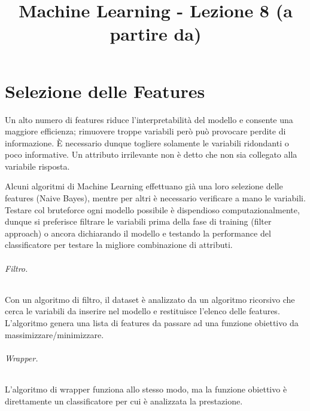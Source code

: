 \documentclass[11pt, a4page, twocolumn]{article}
\title{Machine Learning - Lezione 8 (a partire da)}
\date{}
\begin{document}
\maketitle


\part{Selezione delle Features}
Un alto numero di features riduce l'interpretabilità del modello e consente una maggiore efficienza; rimuovere troppe variabili però può provocare perdite di informazione.
È necessario dunque togliere solamente le variabili ridondanti o poco informative.
Un attributo irrilevante non è detto che non sia collegato alla variabile risposta. \newline

Alcuni algoritmi di Machine Learning effettuano già una loro selezione delle features (Naive Bayes), mentre per altri è necessario verificare a mano le variabili.
Testare col bruteforce ogni modello possibile è dispendioso computazionalmente, dunque si preferisce filtrare le variabili prima della fase di training (filter approach) o ancora dichiarando il modello e testando la performance del classificatore per testare la migliore combinazione di attributi.

\paragraph{Filtro.}
Con un algoritmo di filtro, il dataset è analizzato da un algoritmo ricorsivo che cerca le variabili da inserire nel modello e restituisce l'elenco delle features.
L'algoritmo genera una lista di features da passare ad una funzione obiettivo da massimizzare/minimizzare.

\paragraph{Wrapper.}
L'algoritmo di wrapper funziona allo stesso modo, ma la funzione obiettivo è direttamente un classificatore per cui è analizzata la prestazione. \newline
\end{document}

